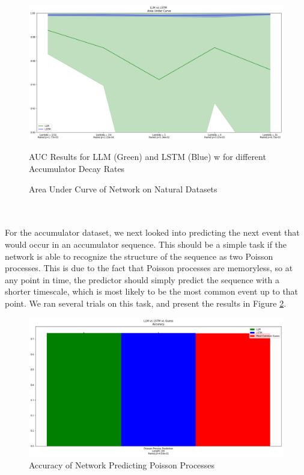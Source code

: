 \begin{figure}
    \centering
    \includegraphics[width=1.0\textwidth]{figures/Synth_Accum_Data_Results_AUC.png}
    \caption{Area Under Curve of Network on Natural Datasets}
    \label{fig:SAresAUC}
    AUC Results for LLM (Green) and LSTM (Blue) w for different Accumulator Decay Rates
\end{figure}
\\\\For the accumulator dataset, we next looked into predicting the next event that would occur in an accumulator sequence. This should be a simple task if the network is able to recognize the structure of the sequence as two Poisson processes. This is due to the fact that Poisson processes are memoryless, so at any point in time, the predictor should simply predict the sequence with a shorter timescale, which is most likely to be the most common event up to that point. We ran several trials on this task, and present the results in Figure \ref{fig:pred_acc}.
\begin{figure}
    \centering
    \includegraphics[width=1.0\textwidth]{figures/Accum_Pred.png}
    \caption{Accuracy of Network Predicting Poisson Processes}
    \label{fig:pred_acc}
    
\end{figure}

